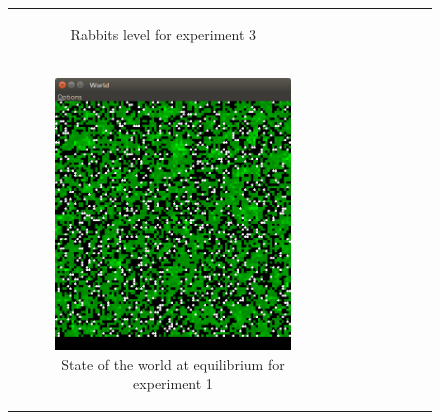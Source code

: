 \documentclass[11pt]{article}
\begin{document}
\begin{figure}
\begin{tabular}{c c c}
\begin{subfigure}[b]{0.3\textwidth}
        \caption{\label{img:rabbits3} Rabbits level for experiment 3}
    \end{subfigure}\\
    \multicolumn{2}{c}{\begin{subfigure}[b]{0.3\textwidth}
        \includegraphics[width=\textwidth]{experiment/1/Space.png}
        \caption{\label{img:world1} State of the world at equilibrium for experiment 1}
    \end{subfigure}} & 
    \begin{subfigure}[b]{0.3\textwidth}

\end{subfigure}
\end{tabular}
\end{figure}
\end{document}
